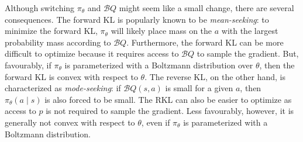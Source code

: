 \documentclass{article}
\newcommand{\statespace}{\mathcal{S}}
\newcommand{\actionspace}{\mathcal{A}}
\newcommand{\Qhat}{{Q}}
\newcommand{\policyparams}{\theta}
\newcommand{\boltzmannQ}{\mathcal{B}Q}
\begin{document}
Although switching $\pi_\policyparams$ and $\boltzmannQ$ might seem like a small change, there are several consequences. The forward KL is popularly known to be \textit{mean-seeking}: to minimize the forward KL, $\pi_\policyparams$ will likely place mass on the $a$ with the largest probability mass according to $\boltzmannQ$. Furthermore, the forward KL can be more difficult to optimize because it requires access to $\boltzmannQ$ to sample the gradient. But, favourably, if $\pi_\theta$ is parameterized with a Boltzmann distribution over $\theta$, then the forward KL is convex with respect to $\theta$. The reverse KL, on the other hand, is characterized as \textit{mode-seeking}: if $\boltzmannQ(s, a)$ is small for a given $a$, then $\pi_\theta(a \mid s)$ is also forced to be small. The RKL can also be easier to optimize as access to $p$ is not required to sample the gradient. Less favourably, however, it is generally not convex with respect to $\theta$, even if $\pi_\theta$ is parameterized with a Boltzmann distribution. 




\end{document}
